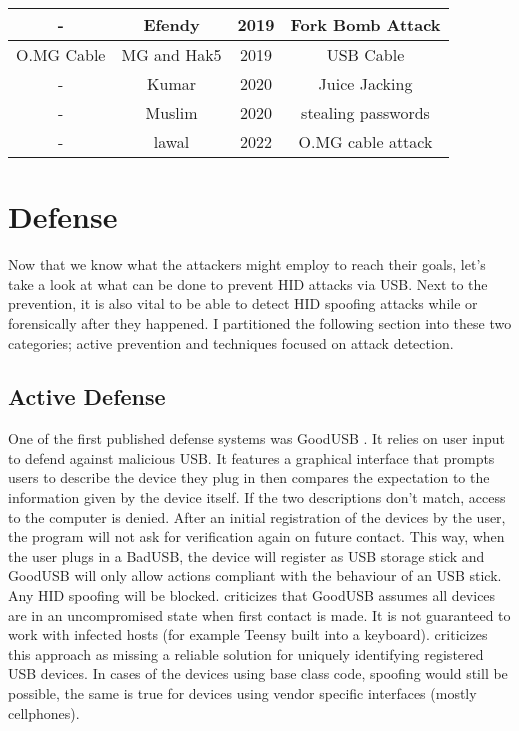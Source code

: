 \begin{center}
\begin{tabular}{|c c c c|}
 \hline
  - & Efendy\cite{efendyExploringPossibilityUSB2019} & 2019 & Fork Bomb Attack \\
 \hline
 O.MG Cable & MG and Hak5  \cite{hak5MGCable} \cite{MGCable2019a} & 2019 & USB Cable \\
 \hline
- & Kumar \cite{kumarJuiceJackingUSB2020} & 2020 & Juice Jacking \\
\hline
- & Muslim \cite{muslimImplementationAnalysisUSB2020} & 2020 & stealing passwords \\
\hline
-  & lawal \cite{lawalFacilitatingCyberenabledFraud2022} & 2022 & O.MG cable attack \\
 \hline 
\end{tabular}
\end{center}

\section{Defense}

Now that we know what the attackers might employ to reach their goals, let's take a look at what can be done to prevent HID attacks via USB. 
Next to the prevention, it is also vital to be able to detect HID spoofing attacks while or forensically after they happened. 
I partitioned the following section into these two categories; active prevention and techniques focused on attack detection.

\subsection{Active Defense}

One of the first published defense systems was GoodUSB \cite{tianDefendingMaliciousUSB2015}. It relies on user input to defend against malicious USB. It features a graphical interface that prompts users to describe the device they plug in then compares the expectation to the information given by the device itself. If the two descriptions don't match, access to the computer is denied. After an initial registration of the devices by the user, the program will not ask for verification again on future contact. This way, when the user plugs in a BadUSB, the device will register as USB storage stick and GoodUSB will only allow actions compliant with the behaviour of an USB stick. Any HID spoofing will be blocked.
\cite{nissimUSBbasedAttacks2017} criticizes that GoodUSB assumes all devices are in an uncompromised state when first contact is made. It is not guaranteed to work with infected hosts (for example Teensy built into a keyboard). 
\cite{mohammadmoradiMakingWhitelistingBasedDefense2018} criticizes this approach as missing a reliable solution for uniquely identifying registered USB devices. In cases of the devices using base class code, spoofing would still be possible, the same is true for devices using vendor specific interfaces (mostly cellphones). 

